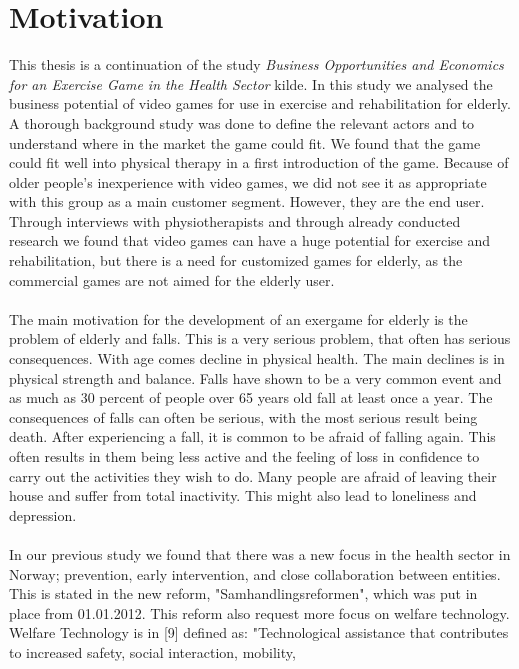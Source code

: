 \chapter{Motivation}
This thesis is a continuation of the study \emph{Business Opportunities and Economics for an Exercise Game in the Health Sector} kilde. In this study we analysed the business potential of video games for use in exercise and rehabilitation for elderly. A thorough background study was done to define the relevant actors and to understand where in the market the game could fit. We found that the game could fit well into physical therapy in a first introduction of the game. Because of older people's inexperience with video games, we did not see it as appropriate with this group as a main customer segment. However, they are the end user. Through interviews with physiotherapists and through already conducted research we found that video games can have a huge potential  for exercise and rehabilitation, but there is a need for customized games for elderly, as the commercial games are not aimed for the elderly user. \\ \\
The main motivation for the development of an exergame for elderly is the problem of elderly and falls. This is a very serious problem, that often has serious consequences. With age comes decline in physical health. The main declines is in physical strength and balance. Falls have shown to be a very common event and as much as 30 percent of people over 65 years old fall at least once a year. The consequences of falls can often be serious, with the most serious result being death. After experiencing a fall, it is common to be afraid of falling again. This often results in them being less active and the feeling of loss in confidence to carry out the activities they wish to do. Many people are afraid of leaving their house and suffer from total inactivity. This might also lead to loneliness and depression. \\ \\
In our previous study we found that there was a new focus in the health sector in Norway; prevention, early intervention, and close collaboration between entities. This is stated in the new reform, "Samhandlingsreformen", which was put in place from 01.01.2012. This reform also request more focus on welfare technology. Welfare Technology is in [9] defined as: "Technological assistance that contributes to increased safety, social interaction, mobility,
